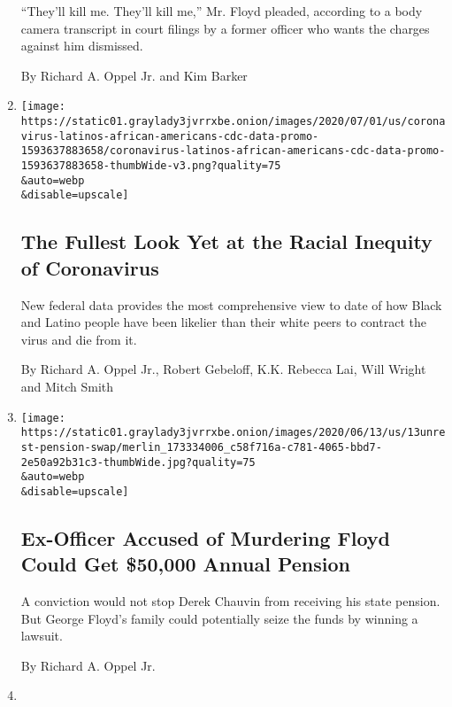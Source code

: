 \begin{enumerate}
  ``They'll kill me. They'll kill me,'' Mr. Floyd pleaded, according to
  a body camera transcript in court filings by a former officer who
  wants the charges against him dismissed.

  By Richard A. Oppel Jr. and Kim Barker
\item
  \href{/interactive/2020/07/05/us/coronavirus-latinos-african-americans-cdc-data.html}{}

  \texttt{[image: https://static01.graylady3jvrrxbe.onion/images/2020/07/01/us/coronavirus-latinos-african-americans-cdc-data-promo-1593637883658/coronavirus-latinos-african-americans-cdc-data-promo-1593637883658-thumbWide-v3.png?quality=75\\\&auto=webp\\\&disable=upscale]}

  \hypertarget{the-fullest-look-yet-at-the-racial-inequity-of-coronavirus}{%
  \subsection{The Fullest Look Yet at the Racial Inequity of
  Coronavirus}\label{the-fullest-look-yet-at-the-racial-inequity-of-coronavirus}}

  New federal data provides the most comprehensive view to date of how
  Black and Latino people have been likelier than their white peers to
  contract the virus and die from it.

  By Richard A. Oppel Jr., Robert Gebeloff, K.K. Rebecca Lai, Will
  Wright and Mitch Smith
\item
  \href{/2020/06/13/us/chauvin-pension-conviction-floyd.html}{}

  \texttt{[image: https://static01.graylady3jvrrxbe.onion/images/2020/06/13/us/13unrest-pension-swap/merlin\_173334006\_c58f716a-c781-4065-bbd7-2e50a92b31c3-thumbWide.jpg?quality=75\\\&auto=webp\\\&disable=upscale]}

  \hypertarget{ex-officer-accused-of-murdering-floyd-could-get-50000-annual-pension}{%
  \subsection{Ex-Officer Accused of Murdering Floyd Could Get \$50,000
  Annual
  Pension}\label{ex-officer-accused-of-murdering-floyd-could-get-50000-annual-pension}}

  A conviction would not stop Derek Chauvin from receiving his state
  pension. But George Floyd's family could potentially seize the funds
  by winning a lawsuit.

  By Richard A. Oppel Jr.
\item
  \href{/2020/06/08/us/unrest-defund-police.html}{}


\end{enumerate}
